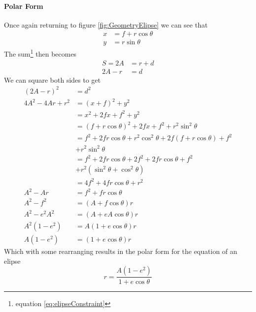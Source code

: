 \paragraph{Polar Form}
Once again returning to figure \ref{fig:GeometryElipse} we can see that 
\begin{align}
x &= f+r\cos \theta \label{eq:ElipseXTheta}\\
y &= r \sin \theta \label{eq:ElipseYTheta}
\end{align}
The sum\footnote{equation \ref{eq:elipseConstraint} \pageref{eq:elipseConstraint}} then becomes
\begin{align}
S = 2A &= r + d\nonumber \\
2A -r &= d
\end{align}
We can square both sides to get
\begin{align}
\left(2A -r\right)^2 &= d^2\nonumber \\
4A^2 -4Ar +r^2 &= (x+f)^2+y^2\nonumber \\
&= x^2+2fx+f^2+y^2\nonumber \\
&= \left(f+r \cos \theta\right)^2+2fx+f^2+r^2\sin^2\theta \nonumber \\
&= f^2+2fr \cos \theta + r^2 \cos^2\theta+2f\left(f+r \cos \theta\right)+f^2 \nonumber \\
&+r^2\sin^2\theta \nonumber \\
 &= f^2+2fr \cos \theta +2f^2+2fr \cos\theta+f^2\nonumber \\
&+r^2(\sin^2\theta+\cos^2\theta)\nonumber \\
 &= 4f^2+4fr \cos \theta+r^2\nonumber \\
A^2 -Ar &= f^2+fr \cos \theta\nonumber \\
A^2 -f^2 &= \left( A+f \cos \theta\right) r\nonumber \\
A^2 -e^2A^2 &= \left( A+eA \cos \theta\right) r\nonumber \\
A^2\left(1-e^2\right)&= A\left( 1+e \cos \theta\right) r\nonumber \\
A\left(1-e^2\right)&= \left( 1+e \cos \theta\right) r
\end{align}
Which with some rearranging results in the polar form for the equation of an elipse
\begin{equation}
r = \frac{A\left(1-e^2\right)}{ 1+e \cos \theta}\label{eq:PolarElipse}
\end{equation}

